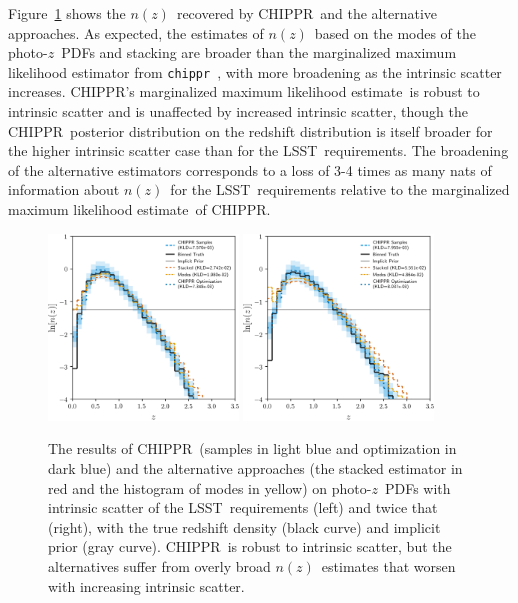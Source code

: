 \documentclass[iop]{emulateapj}
\newcommand{\Fig}[1]{Figure~\ref{#1}}
\newcommand{\project}[1]{{\textsc{#1}}}
\newcommand{\lsst}{\project{LSST}}
\newcommand{\Chippr}{\project{CHIPPR}}
\newcommand{\repo}[1]{{\texttt{#1}}~}
\newcommand{\chippr}{\repo{chippr}}
\newcommand{\nz}{$n(z)$}
\newcommand{\pz}{photo-$z$~}
\newcommand{\pzpdf}{\pz PDF}
\newcommand{\mmle}{marginalized maximum likelihood estimate}
\begin{document}
\Fig{fig:results-scatter} shows the \nz\ recovered by \Chippr\ and the alternative approaches.
As expected, the estimates of \nz\ based on the modes of the \pzpdf s and stacking are broader than the marginalized maximum likelihood estimator from \chippr, with more broadening as the intrinsic scatter increases.
\Chippr's \mmle\ is robust to intrinsic scatter and is unaffected by increased intrinsic scatter, though the \Chippr\ posterior distribution on the redshift distribution is itself broader for the higher intrinsic scatter case than for the \lsst\ requirements.
The broadening of the alternative estimators corresponds to a loss of 3-4 times as many nats of information about \nz\ for the \lsst\ requirements relative to the \mmle\ of \Chippr.

\begin{figure}
	\begin{center}
	\includegraphics[width=0.45\textwidth]{figures/chippr/results_scatter1.png}
	\includegraphics[width=0.45\textwidth]{figures/chippr/results_scatter2.png}
	\caption{
		The results of \Chippr\ (samples in light blue and optimization in dark blue) and the alternative approaches (the stacked estimator in red and the histogram of modes in yellow) on \pzpdf s with intrinsic scatter of the \lsst\ requirements (left) and twice that (right), with the true redshift density (black curve) and implicit prior (gray curve).
		\Chippr\ is robust to intrinsic scatter, but the alternatives suffer from overly broad \nz\ estimates that worsen with increasing intrinsic scatter.
	}
	\label{fig:results-scatter}
	\end{center}
\end{figure}
\end{document}
